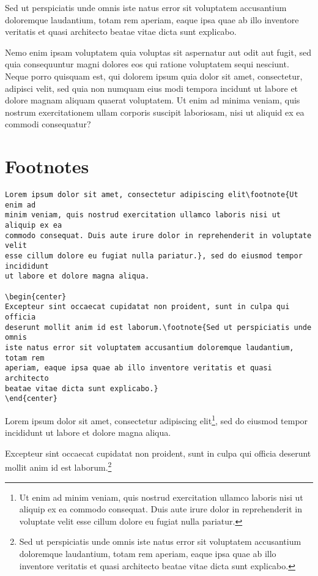 \begin{flushright}
Sed ut perspiciatis unde omnis iste natus error sit voluptatem accusantium
doloremque laudantium, totam rem aperiam, eaque ipsa quae ab illo inventore
veritatis et quasi architecto beatae vitae dicta sunt explicabo.
\end{flushright}

Nemo enim ipsam voluptatem quia voluptas sit aspernatur aut odit aut fugit,
sed quia consequuntur magni dolores eos qui ratione voluptatem sequi nesciunt.
\ccpar{}
Neque porro quisquam est, qui dolorem ipsum quia dolor sit amet, consectetur,
adipisci velit, sed quia non numquam eius modi tempora incidunt ut labore et
dolore magnam aliquam quaerat voluptatem.
\ccpar{}
Ut enim ad minima veniam, quis nostrum exercitationem ullam corporis suscipit
laboriosam, nisi ut aliquid ex ea commodi consequatur?

\section*{Footnotes}%
\label{sec:footnotes}

\begin{lstlisting}[caption={Some footnotes.}]
Lorem ipsum dolor sit amet, consectetur adipiscing elit\footnote{Ut enim ad
minim veniam, quis nostrud exercitation ullamco laboris nisi ut aliquip ex ea
commodo consequat. Duis aute irure dolor in reprehenderit in voluptate velit
esse cillum dolore eu fugiat nulla pariatur.}, sed do eiusmod tempor incididunt
ut labore et dolore magna aliqua.

\begin{center}
Excepteur sint occaecat cupidatat non proident, sunt in culpa qui officia
deserunt mollit anim id est laborum.\footnote{Sed ut perspiciatis unde omnis
iste natus error sit voluptatem accusantium doloremque laudantium, totam rem
aperiam, eaque ipsa quae ab illo inventore veritatis et quasi architecto
beatae vitae dicta sunt explicabo.}
\end{center}
\end{lstlisting}

Lorem ipsum dolor sit amet, consectetur adipiscing elit\footnote{Ut enim ad
minim veniam, quis nostrud exercitation ullamco laboris nisi ut aliquip ex ea
commodo consequat. Duis aute irure dolor in reprehenderit in voluptate velit
esse cillum dolore eu fugiat nulla pariatur.}, sed do eiusmod tempor incididunt
ut labore et dolore magna aliqua.

\begin{center}
Excepteur sint occaecat cupidatat non proident, sunt in culpa qui officia
deserunt mollit anim id est laborum.\footnote{Sed ut perspiciatis unde omnis
iste natus error sit voluptatem accusantium doloremque laudantium, totam rem
aperiam, eaque ipsa quae ab illo inventore veritatis et quasi architecto
beatae vitae dicta sunt explicabo.}
\end{center}


